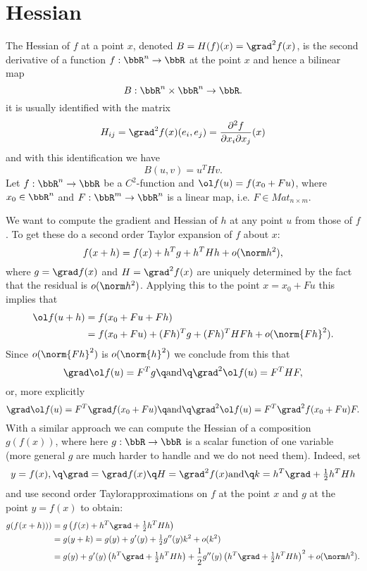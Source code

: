 \section{Hessian}

The Hessian of $f$ at a point $x$, denoted $B=H(f)(x)=\grad^2f(x)$, 
is the second derivative of
a function $f:\bbR^n\to\bbR$ at the point $x$ and hence a bilinear map
$$
B:\bbR^n\times\bbR^n\to\bbR.
$$
it is usually identified with the matrix
$$
H_{ij}=\grad^2f(x)(e_i,e_j)=\frac{\partial^2f}{\partial x_i\partial x_j}(x)
$$
and with this identification we have
$$
B(u,v)=u^THv.
$$
Let $f:\bbR^n\to\bbR$ be a $C^2$-function and $\ol f(u)=f(x_0+Fu)$, where  $x_0\in\bbR^n$
and $F:\bbR^m\to\bbR^n$ is a linear map, i.e. $F\in Mat_{n\times m}$.

We want to compute the gradient and Hessian of $h$ at any point $u$ from those of $f$.
To get these do a second order Taylor expansion of $f$ about $x$:
$$
f(x+h)=f(x)+h^Tg+h^THh+o(\norm h^2),
$$
where $g=\grad f(x)$ and $H=\grad^2f(x)$ are uniquely determined by the fact that
the residual is $o(\norm h^2)$. Applying this to the point $x=x_0+Fu$ this implies
that
%
\begin{align*}
\ol f(u+h)&=f(x_0+Fu+Fh)
\\&=
f(x_0+Fu)+(Fh)^Tg+(Fh)^THFh+o(\norm{Fh}^2).
\end{align*}
%
Since $o(\norm{Fh}^2)$ is $o(\norm{h}^2)$ we conclude from this that
$$
\grad\ol f(u)=F^Tg\q\text{and}\q \grad^2\ol f(u)=F^THF,
$$
or, more explicitly
%
\begin{equation}
\label{diff_lin_trans}
\grad\ol f(u)=F^T\grad f(x_0+Fu)
\q\text{and}\q
\grad^2\ol f(u)=F^T\grad^2 f(x_0+Fu)F.
\end{equation}
%
With a similar approach we can compute the Hessian of a composition $g(f(x))$, where
here $g:\bbR\to\bbR$ is a scalar function of one variable (more general $g$ are much harder
to handle and we do not need them).
Indeed, set
$$
y=f(x),\q\grad=\grad f(x)\q H=\grad^2f(x)\text{and}\q k=h^T\grad+\tfrac{1}{2}h^THh
$$
and use second order Taylorapproximations on $f$ at
the point $x$ and $g$ at the point $y=f(x)$ to obtain:
%
\begin{align*}
g(f(x+h)))&=g\left(f(x)+h^T\grad+\tfrac{1}{2}h^THh\right)
\\&=
g(y+k)=g(y)+g'(y)+\tfrac{1}{2}g''(y)k^2+o(k^2)
\\&=
g(y)+g'(y)\left(h^T\grad+\tfrac{1}{2}h^THh\right)+
\frac{1}{2}g''(y)\left(h^T\grad+\tfrac{1}{2}h^THh\right)^2+o(\norm h^2).
\end{align*}
